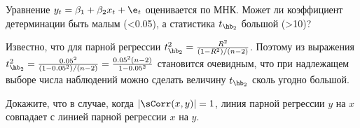 \documentclass[pdftex,11pt,openany]{book}\usepackage[]{graphicx}\usepackage[]{color}
\begin{document}
\begin{problem}
Уравнение $y_t = \beta_1 + \beta_2 x_t + \e_t$ оценивается по МНК. Может ли коэффициент детерминации быть малым (<0.05), а статистика $t_{\hb_2}$ большой (>10)?
\end{problem}

\begin{solution}
Известно, что для парной регрессии $t_{\hb_2}^2 = \frac{R^2}{(1 - R^2)/(n-2)}$. Поэтому из выражения $t_{\hb_2}^2 = \frac{0.05^2}{(1 - 0.05^2)/(n-2)} = \frac{0.05^2 (n-2)}{1 - 0.05^2}$ становится очевидным, что при надлежащем выборе числа наблюдений можно сделать величину $t_{\hb_2}$ сколь угодно большой.
\end{solution}


\begin{problem}
 Докажите, что в случае, когда $|\sCorr(x, y)| = 1$, линия парной регрессии $y$ на $x$ совпадает с линией парной регрессии $x$ на $y$.
\end{problem}
\end{document}
